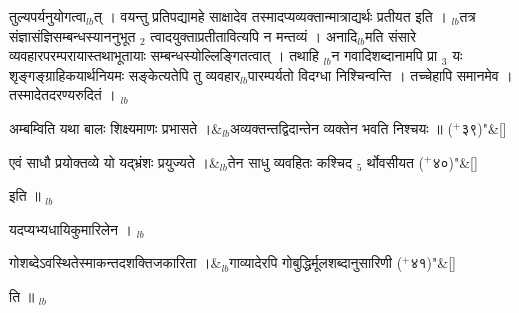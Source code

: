 \documentclass[article,12pt,a4paper]{memoir}%
\newcommand{\add}[1]{($^{+}$#1)}
\newcounter{parCount}
\begin{document}
तुल्यपर्यनुयोगत्वा{\tiny $_{lb}$}त् । वयन्तु प्रतिपद्यामहे साक्षादेव तस्मादप्यव्यक्तान्मात्राद्यर्थः प्रतीयत इति । {\tiny $_{lb}$}तत्र संज्ञासंज्ञिसम्बन्धस्याननुभूत {\tiny $_{2}$} त्वादयुक्ताप्रतीतावित्यपि न मन्तव्यं । अनादि{\tiny $_{lb}$}मति संसारे व्यवहारपरम्परायास्तथाभूतायाः सम्बन्धस्योल्लिङ्गितत्वात् । तथाहि {\tiny $_{lb}$}न गवादिशब्दानामपि प्रा {\tiny $_{3}$} यः शृङ्गङ्ग्राहिकयार्थनियमः सङ्केत्यतेपि तु व्यवहार{\tiny $_{lb}$}पारम्पर्यतो विदग्धा निश्चिन्वन्ति । तच्चेहापि समानमेव । तस्मादेतदरण्यरुदितं । {\tiny $_{lb}$} 
	    \pend%
	  
	    
	    \stanza[\smallbreak]
	  अम्बम्विति यथा बालः शिक्ष्यमाणः प्रभासते ।&{\tiny $_{lb}$}अव्यक्तन्तद्विदान्तेन व्यक्तेन भवति निश्चयः ॥ \add{३९}{\normalfontlatin\large\qquad{}"}\&[\smallbreak]
	  
	  
	  
	    \pstart  \leavevmode%
	    \hphantom{.}
	   
	    \pend%
	  
	    
	    \stanza[\smallbreak]
	  एवं साधौ प्रयोक्तव्ये यो यद्भ्रंशः प्रयुज्यते ।&{\tiny $_{lb}$}तेन साधु व्यवहितः कश्चिद {\tiny $_{5}$} र्थोवसीयत \add{४०}{\normalfontlatin\large\qquad{}"}\&[\smallbreak]
	  
	  
	  
	    \pstart  \leavevmode%
	    \hphantom{.}
	   इति ॥
	{}
	\pend%
      {\tiny $_{lb}$}

	  
	  \pstart \leavevmode%
	\hphantom{.}यदप्यभ्यधायि{\color{DodgerBlue3}कुमारिलेन ।} {\tiny $_{lb}$} \leavevmode{} 
	    \pend%
	  
	    
	    \stanza[\smallbreak]
	  गोशब्देऽवस्थितेस्माकन्तदशक्तिजकारिता ।&{\tiny $_{lb}$}गाव्यादेरपि गोबुद्धिर्मूलशब्दानुसारिणी \add{४१}{\normalfontlatin\large\qquad{}"}\&[\smallbreak]
	  
	  
	  
	    \pstart  \leavevmode%
	    \hphantom{.}
	   ति ॥
	{}
	\pend%
      {\tiny $_{lb}$}
\end{document}
